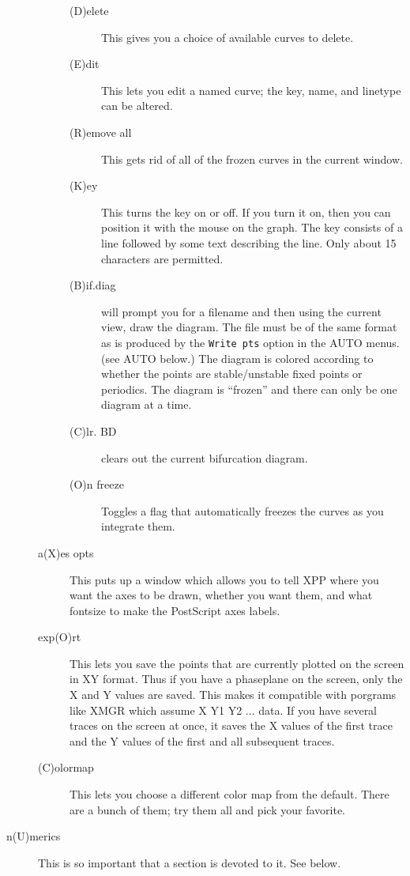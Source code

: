 \documentclass{article}
\begin{document}
\begin{description}
\begin{description}
\begin{description}
\item[(D)elete]  This gives you a choice of available curves to
delete.
\item[(E)dit] This lets you edit a named curve; the key, name, and
linetype can be altered.   
\item[(R)emove all]  This gets rid of all of the frozen curves in the
current window.
\item[(K)ey] This turns the key on or off.  If you turn it on, then
you can position it with the mouse on the graph.  The key consists of
a line followed by some text describing the line.  Only about 15
characters are permitted.
\item[(B)if.diag] will prompt you for a filename and then using the
current view, draw the diagram. The file must be of the same format as
is produced by the {\tt Write pts} option in the AUTO menus. (see AUTO
below.)  The diagram is colored according to whether the points are
stable/unstable fixed points or periodics. The diagram is ``frozen''
and there can only be one diagram at a time.  
\item[(C)lr. BD] clears out the current bifurcation diagram.
\item[(O)n freeze] Toggles a flag that automatically freezes the
curves as you integrate them.
\end{description}
\item[a(X)es opts]  This puts up a window which allows you to tell XPP
where you want the axes to be drawn, whether you want them, and what
fontsize to make the PostScript axes labels.  
\item[exp(O)rt]  This lets you save the points that are currently
plotted on the screen in XY format. Thus if you have a phaseplane on
the screen, only the X and Y values are saved. This makes it
compatible with porgrams like XMGR which assume X Y1 Y2 ... data. If
you have several traces on the screen at once, it saves the X values
of the first trace and the Y values of the first and all subsequent
traces.
\item[(C)olormap] This lets you choose a different color map from the
default. There are a bunch of them; try them all and pick your
favorite. 

\end{description}

\item[n(U)merics] This is so important that a section is devoted to
it. See below.


\end{description}
\end{document}
